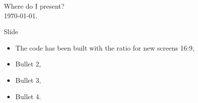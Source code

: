 \documentclass[t,aspectratio=\currentAspect]{beamer}
\def\oldAspect{43}
\begin{document}
\begin{frame}
\vspace{-10pt}
\begin{center}
\end{center}

\begin{center}
Where do I present?\\
\today.
\end{center}
\end{frame}



\ifx\currentAspect\oldAspect
	\def\sometext{The code has been built with the ratio for old screens 4:3}
\else
	\def\sometext{The code has been built with the ratio for new screens 16:9}
\fi



\begin{frame}{Slide }
\begin{itemize}
\setlength\itemsep{\fill}
\item \sometext,
\item Bullet 2,
\item Bullet 3,
\item Bullet 4.
\end{itemize}
\end{frame}
\end{document}
